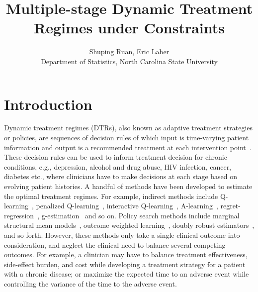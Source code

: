 \documentclass{article}
\title{Multiple-stage Dynamic Treatment Regimes under Constraints}
\author{Shuping Ruan, Eric Laber\\ Department of Statistics, North Carolina State University}
\date{\vspace{-5ex}}
\begin{document}
\maketitle

\section{Introduction}
Dynamic treatment regimes (DTRs), also known as adaptive treatment strategies or policies, are sequences of decision rules of which input is time-varying patient information and output is a recommended treatment at each intervention point~\cite{Chakraborty2014, Moodie2004, Murphy2003}. These decision rules can be used to inform treatment decision for chronic conditions, e.g., depression, alcohol and drug abuse, HIV infection, cancer, diabetes etc., where clinicians have to make decisions at each stage based on evolving patient histories. A handful of methods have been developed to estimate the optimal treatment regimes. For example, indirect methods include Q-learning~\cite{Nahum2012}, penalized Q-learning~\cite{Song2011}, interactive Q-learning~\cite{Linn2014}, A-learning~\cite{Schulte2014}, regret-regression~\cite{henderson2010}, g-estimation~\cite{gestimation} and so on. Policy search methods include marginal structural mean models~\cite{Robins2000,Orellana2010a}, outcome weighted learning~\cite{Zhao2012,Zhang2012,Zhao2015}, doubly robust estimators~\cite{Zhang2012b}, and so forth. However, these methods only take a single clinical outcome into consideration, and neglect the clinical need to balance several competing outcomes. For example, a clinician may have to balance treatment effectiveness, side-effect burden, and cost while developing a treatment strategy for a patient with a chronic disease; or maximize the expected time to an adverse event while controlling the variance of the time to the adverse event.\\
\end{document}
